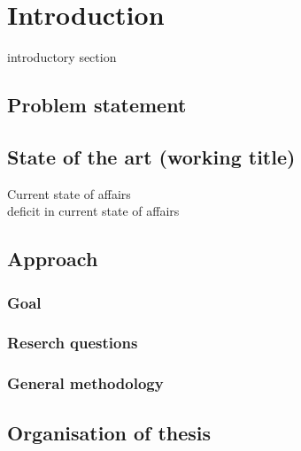 \chapter{Introduction}
introductory section \\
\section{Problem statement}
\section{State of the art (working title)}
Current state of affairs \\
deficit in current state of affairs
\section{Approach}
\subsection{Goal}
\subsection{Reserch questions}
\subsection{General methodology}
\section{Organisation of thesis}
